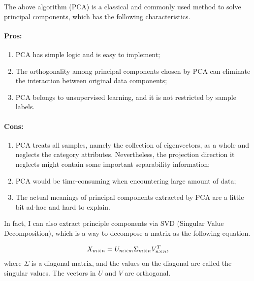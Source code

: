 \documentclass[12pt,a4paper]{article}
\theoremstyle{definition}
\begin{document}
The above algorithm (PCA) is a classical and commonly used method to solve principal components, which has the following characteristics.

\vspace{-0.012\linewidth}
\paragraph{Pros:}
\begin{enumerate}
	\item PCA has simple logic and is easy to implement;
	
	\item The orthogonality among principal components chosen by PCA can eliminate the interaction between original data components;
	
	\item PCA belongs to unsupervised learning, and it is not restricted by sample labels.
\end{enumerate}

\vspace{-0.03\linewidth}
\paragraph{Cons:}
\begin{enumerate}
	\item PCA treats all samples, namely the collection of eigenvectors, as a whole and neglects the category attributes. Nevertheless, the projection direction it neglects might contain some important separability information;
	
	\item PCA would be time-consuming when encountering large amount of data;
	
	\item The actual meanings of principal components extracted by PCA are a little bit ad-hoc and hard to explain.
\end{enumerate}

In fact, I can also extract principle components via SVD (Singular Value Decomposition), which is a way to decompose a matrix as the following equation. 

\begin{equation*}
	\centering
	X_{m \times n} = U_{m \times m} \Sigma_{m \times n} V^T_{n \times n},
\end{equation*}
where $\Sigma$ is a diagonal matrix, and the values on the diagonal are called the singular values. The vectors in $U$ and $V$ are orthogonal.
\end{document}
